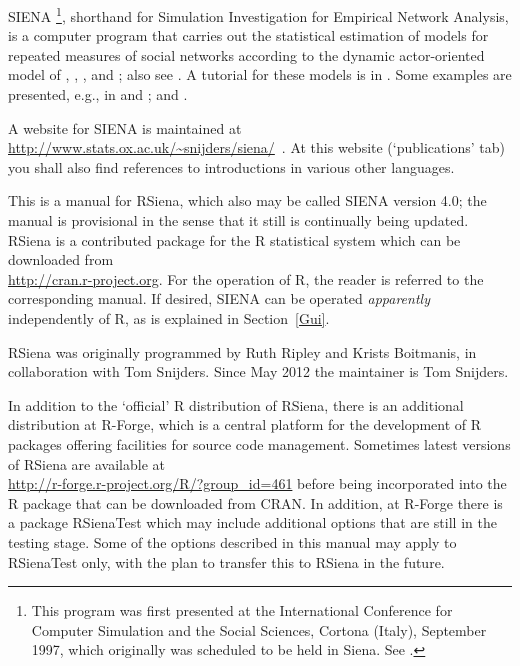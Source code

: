 \documentclass[a4paper,fleqn,11pt]{article}
\newcommand{\+}{\, + \,}
\newcommand{\R}{{\sf R }}
\newcommand{\Rn}{{\sf R}}
\newcommand{\rs}{{\sf RSiena}}
\newcommand{\RS}{{\sf RSiena }}
\newcommand{\SI}{{\sf SIENA }}
\newcommand{\si}{{\sf SIENA}}
\begin{document}
\si
\footnote{This program was first presented at the
International Conference for Computer Simulation and the Social
Sciences, Cortona (Italy), September 1997, which originally was
scheduled to be held in Siena. See \citet{SnijdersDuijn97}.},
shorthand for {\sf Simulation Investigation for Empirical
Network Analysis}, is a computer program that carries out the
statistical estimation of models for repeated measures of social
networks according to the dynamic actor-oriented model of \citet{SnijdersDuijn97}, \citet{Snijders01},
\citet*{SnijdersEA07}, and \citet*{SnijdersEA10a}; also see
\citet*{SteglichEA10}.
A tutorial for these models is in \citet*{SnijdersEA10b}.
Some examples are
presented, e.g., in \citet*{vanBunt99, vanBuntEA99} and \citet*{vanDuijnEA03};
and \citet*{SteglichEA06}.

A website for \SI is maintained at
{\small\url{http://www.stats.ox.ac.uk/~snijders/siena/}~}.
At this website (`publications' tab)
you shall also find references to introductions in various other languages.

This is a manual for \rs, which also may be called \SI version 4.0;
the manual is provisional in the sense
that it still is continually being updated.
\RS is a contributed package for the \R statistical system
which can be downloaded from\\
\url{http://cran.r-project.org}. For the operation of \Rn,
the reader is referred
to the corresponding manual. If desired, \SI can be operated \emph{apparently}
independently of \Rn, as is explained in Section~\ref{Gui}.

\RS was originally programmed by Ruth Ripley and Krists Boitmanis,
in collaboration with Tom Snijders.
Since May 2012 the maintainer is Tom Snijders.

In addition to the `official' \R distribution of \rs, there is
an additional distribution at R-Forge, which is
a central platform for the development of \R packages
offering facilities for source code management.
Sometimes latest versions of \RS are available at\\
\url{http://r-forge.r-project.org/R/?group_id=461}
before being incorporated into the R package that can be downloaded from CRAN.
In addition, at R-Forge there is a package RSienaTest which may include
additional options that are still in the testing stage.
Some of the options described in this manual may apply to
RSienaTest only, with the plan to transfer this to \RS
in the future.
\end{document}

